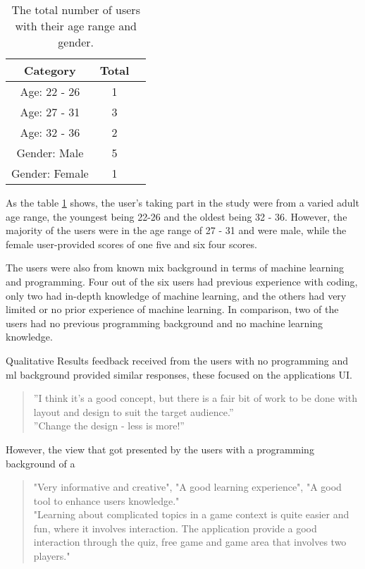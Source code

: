 		\begin{table}[h!]
		\centering
		\begin{tabular}{|c|c|c }
			\hline
			Category & Total \\ 
			\hline
			Age: 22 - 26 & 1 \\ 
			\hline 
			Age: 27 - 31 & 3 \\
			\hline
			Age: 32 - 36 & 2 \\ 
			\hline 
			Gender: Male & 5 \\
			\hline
			Gender: Female & 1 \\ 
			\hline 
			
		\end{tabular}
		\caption{The total number of users with their age range and gender.}
		\label{table:results_age_gender}
	\end{table}
	
	As the table \ref{table:results_age_gender} shows, the user's taking part in the study were from a varied adult age range, the youngest being 22-26 and the oldest being 32 - 36. However, the majority of the users were in the age range of 27 - 31 and were male, while the female user-provided scores of one five and six four scores. 
	
	The users were also from known mix background in terms of machine learning and programming. Four out of the six users had previous experience with coding, only two had in-depth knowledge of machine learning, and the others had very limited or no prior experience of machine learning. In comparison, two of the users had no previous programming background and no machine learning knowledge.
	
	Qualitative Results feedback received from the users with no programming and ml background provided similar responses, these focused on the applications UI. 
	
	\begin{quote}
		\begin{changebar}
			''I think it's a good concept, but there is a fair bit of work to be done with layout and design to suit the target audience.'' \\
			''Change the design - less is more!''
		\end{changebar}
	\end{quote}
	
	However, the view that got presented by the users with a programming background of a 
	
	\begin{quote}
		\begin{changebar}
			"Very informative and creative", "A good learning experience", "A good tool to enhance users knowledge." 
			\\ "Learning about complicated topics in a game context is quite easier and fun, where it involves interaction. The application provide a good interaction through the quiz, free game and game area that involves two players." 
		\end{changebar}
	\end{quote}

